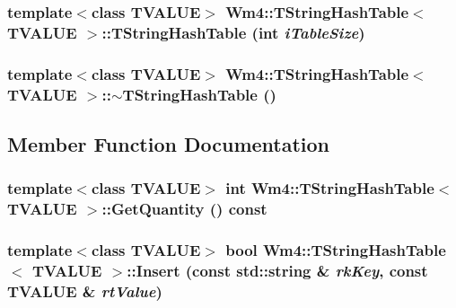 \subsubsection{\setlength{\rightskip}{0pt plus 5cm}template$<$class TVALUE$>$ {\bf Wm4::TString\-Hash\-Table}$<$ TVALUE $>$::{\bf TString\-Hash\-Table} (int {\em i\-Table\-Size})}\label{classWm4_1_1TStringHashTable_2f8e9f17a649a3e9c38f388cdca6e012}


\subsubsection{\setlength{\rightskip}{0pt plus 5cm}template$<$class TVALUE$>$ {\bf Wm4::TString\-Hash\-Table}$<$ TVALUE $>$::$\sim${\bf TString\-Hash\-Table} ()}\label{classWm4_1_1TStringHashTable_9728e8c60fdea12a8c9b7ed9b4204f43}




\subsection{Member Function Documentation}
\subsubsection{\setlength{\rightskip}{0pt plus 5cm}template$<$class TVALUE$>$ int {\bf Wm4::TString\-Hash\-Table}$<$ TVALUE $>$::Get\-Quantity () const}\label{classWm4_1_1TStringHashTable_59651403a906cca5c0aa7d19a471ae82}


\subsubsection{\setlength{\rightskip}{0pt plus 5cm}template$<$class TVALUE$>$ bool {\bf Wm4::TString\-Hash\-Table}$<$ TVALUE $>$::Insert (const std::string \& {\em rk\-Key}, const TVALUE \& {\em rt\-Value})}\label{classWm4_1_1TStringHashTable_b9c25ff9e818e32693f5e7eb16cbedd9}


